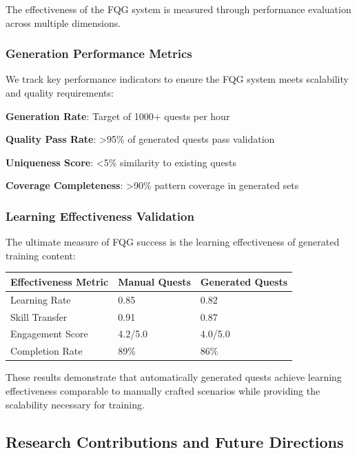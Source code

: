 The effectiveness of the FQG system is measured through performance evaluation across multiple dimensions.

\subsubsection*{Generation Performance Metrics}

We track key performance indicators to ensure the FQG system meets scalability and quality requirements:

\begin{compactlist}
    \item \textbf{Generation Rate}: Target of 1000+ quests per hour
    \item \textbf{Quality Pass Rate}: >95\% of generated quests pass validation
    \item \textbf{Uniqueness Score}: <5\% similarity to existing quests
    \item \textbf{Coverage Completeness}: >90\% pattern coverage in generated sets
\end{compactlist}

\subsubsection*{Learning Effectiveness Validation}

The ultimate measure of FQG success is the learning effectiveness of generated training content:

\begin{center}
\begin{tabular}{@{}lll@{}}
\toprule
\textbf{Effectiveness Metric} & \textbf{Manual Quests} & \textbf{Generated Quests} \\
\midrule
Learning Rate & 0.85 & 0.82 \\
Skill Transfer & 0.91 & 0.87 \\
Engagement Score & 4.2/5.0 & 4.0/5.0 \\
Completion Rate & 89\% & 86\% \\
\bottomrule
\end{tabular}
\end{center}

These results demonstrate that automatically generated quests achieve learning effectiveness comparable to manually crafted scenarios while providing the scalability necessary for training.

\subsection*{Research Contributions and Future Directions}

